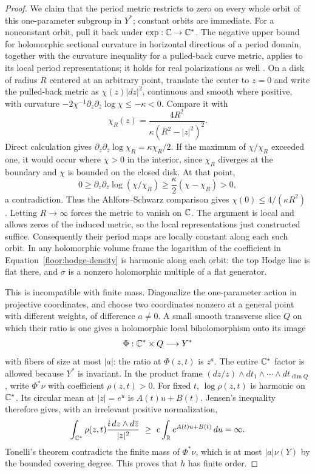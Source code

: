 \begin{proof}
We claim that the period metric restricts to zero on every whole orbit
of this one-parameter subgroup in \(Y^*\); constant orbits are immediate.
For a nonconstant orbit, pull it back under
\(\exp:\mathbb C\to\mathbb C^*\).  The negative upper bound for holomorphic sectional
curvature in horizontal directions of a period domain, together with the
curvature inequality for a pulled-back curve metric, applies to its local
period representations; it holds for real polarizations as well
\cite[Theorem~9.1]{GriffithsSchmid1969}.  On a disk of radius \(R\)
centered at an arbitrary point, translate the center to \(z=0\) and
write the pulled-back metric as \(\chi(z)|dz|^2\), continuous and smooth
where positive, with curvature
\(-2\chi^{-1}\partial_z\partial_{\bar z}\log\chi\le-\kappa<0\).
Compare it with
\[
 \chi_R(z)=\frac{4R^2}{\kappa(R^2-|z|^2)^2}.
\]
Direct calculation gives
\(\partial_z\partial_{\bar z}\log\chi_R=\kappa\chi_R/2\).
If the maximum of \(\chi/\chi_R\) exceeded one, it would occur where
\(\chi>0\) in the interior, since \(\chi_R\) diverges at the boundary
and \(\chi\) is bounded on the closed disk.  At that point,
\[
 0\ge\partial_z\partial_{\bar z}\log(\chi/\chi_R)
   \ge\frac{\kappa}{2}(\chi-\chi_R)>0,
\]
a contradiction.  Thus the Ahlfors--Schwarz comparison gives
\(\chi(0)\le4/(\kappa R^2)\) \cite{Ahlfors1938}.
Letting \(R\to\infty\) forces the metric to vanish
on \(\mathbb C\).  The argument is local and allows zeros of the
induced metric, so the local representations just constructed suffice.
Consequently their period maps are locally constant along each such orbit.
In any holomorphic volume frame the logarithm of the coefficient in
Equation~\eqref{floor:hodge-density} is harmonic along each orbit: the top Hodge line is
flat there, and \(\sigma\) is a nonzero holomorphic multiple of a flat
generator.

This is incompatible with finite mass.  Diagonalize the one-parameter
action in projective coordinates, and choose two coordinates nonzero at a
general point with different weights, of difference \(a\ne0\).  A small
smooth transverse slice \(Q\) on which their ratio is one gives a
holomorphic local biholomorphism onto its image
\[
 \Phi:\mathbb C^*\times Q\longrightarrow Y^*
\]
with fibers of size at most \(|a|\): the ratio at \(\Phi(z,t)\) is
\(z^a\).  The entire \(\mathbb C^*\) factor is allowed because \(Y^*\) is
invariant.  In the product frame \((dz/z)\wedge dt_1\wedge\cdots\wedge
dt_{\dim Q}\), write \(\Phi^*\nu\) with coefficient \(\rho(z,t)>0\).
For fixed \(t\), \(\log\rho(z,t)\) is harmonic on \(\mathbb C^*\).  Its
circular mean at \(|z|=e^u\) is \(A(t)u+B(t)\).  Jensen's inequality
therefore gives, with an irrelevant positive normalization,
\[
 \int_{\mathbb C^*}\rho(z,t)\frac{i\,dz\wedge d\overline z}{|z|^2}
 \ \geq\ c\int_{\mathbb R}e^{A(t)u+B(t)}\,du=\infty.
\]
Tonelli's theorem contradicts the finite mass of \(\Phi^*\nu\), which
is at most \(|a|\nu(Y)\) by the bounded covering degree.  This proves
that \(h\) has finite order.
\end{proof}

